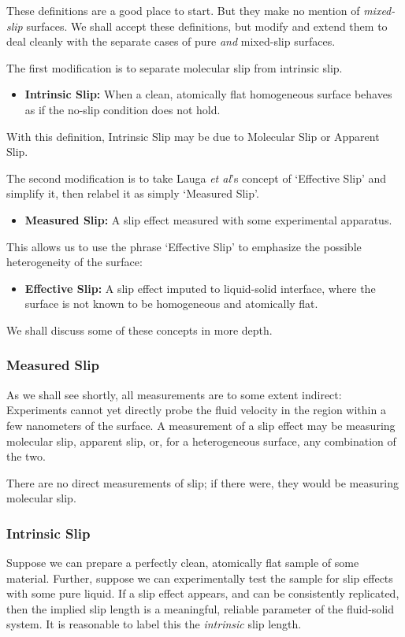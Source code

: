 \documentclass[12pt, a4paper, twoside, openright]{book}
\begin{document}
These definitions are a good place to start.  But they make no mention of \emph{mixed-slip} surfaces.  We shall accept these definitions, but modify and extend them to deal cleanly with the separate cases of pure \emph{and} mixed-slip surfaces.

The first modification is to separate molecular slip from intrinsic slip.

\begin{itemize}
\item \textbf{Intrinsic Slip:} When a clean, atomically flat homogeneous surface behaves as if the no-slip condition does not hold.
\end{itemize}

With this definition, Intrinsic Slip may be due to Molecular Slip or Apparent Slip.

The second modification is to take Lauga \emph{et al}'s concept of `Effective Slip' and simplify it, then relabel it as simply `Measured Slip'.

\begin{itemize}
\item \textbf{Measured Slip:} A slip effect measured with some experimental apparatus.
\end{itemize}

This allows us to use the phrase `Effective Slip' to emphasize the possible heterogeneity of the surface:

\begin{itemize}
\item \textbf{Effective Slip:} A slip effect imputed to liquid-solid interface, where the surface is not known to be homogeneous and atomically flat.
\end{itemize} 

We shall discuss some of these concepts in more depth.

\subsubsection*{Measured Slip}
As we shall see shortly, all measurements are to some extent indirect: Experiments cannot yet directly probe the fluid velocity in the region within a few nanometers of the surface. A measurement of a slip effect may be measuring molecular slip, apparent slip, or, for a heterogeneous surface, any combination of the two.

There are no direct measurements of slip; if there were, they would be measuring molecular slip.


\subsubsection*{Intrinsic Slip}
Suppose we can prepare a perfectly clean, atomically flat sample of some material. Further, suppose we can experimentally test the sample for slip effects with some pure liquid.
If a slip effect appears, and can be consistently replicated, then the implied slip length is a meaningful, reliable parameter of the fluid-solid system. It is reasonable to label this the \emph{intrinsic} slip length.
\end{document}
